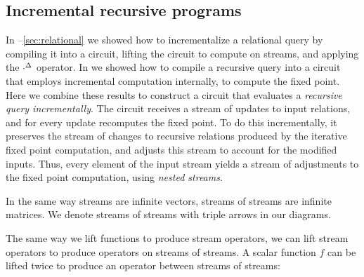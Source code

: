 \subsection{Incremental recursive programs}\label{sec:nested}

In --\ref{sec:relational} we showed how to
incrementalize a relational query by compiling it into a circuit,
lifting the circuit to compute on streams, and applying the
${\cdot}^{\Delta}$ operator.  In  we showed how to
compile a recursive query into a circuit that employs incremental
computation internally, to compute the fixed point.  Here we combine
these results to construct a circuit that evaluates a \emph{recursive
query incrementally}.  The circuit receives a stream of updates to
input relations, and for every update recomputes the fixed point.  To
do this incrementally, it preserves the stream of changes to recursive
relations produced by the iterative fixed point computation, and
adjusts this stream to account for the modified inputs.  Thus, every
element of the input stream yields a stream of adjustments to the
fixed point computation, using \emph{nested streams}.

In the same way streams are infinite vectors, streams of streams are
infinite matrices.  We denote streams of streams with triple arrows in
our diagrams.



The same way we lift functions to produce stream operators, we can
lift stream operators to produce operators on streams of streams.
A scalar function $f$ can be lifted twice to produce an operator
between streams of streams:

\begin{center}
\end{center}

